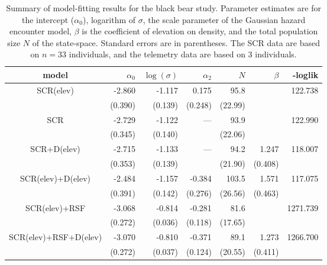 \begin{table}
\centering
\caption{
Summary of model-fitting results for the black bear study. Parameter
estimates are for the intercept ($\alpha_{0}$), logarithm of $\sigma$,
the
scale parameter of the Gaussian hazard encounter model,
 $\beta$ is the coefficient of elevation on density, and the total
 population size $N$ of the state-space. Standard errors
 are in parentheses.
The SCR data are based on $n=33$ individuals, and the telemetry data
are based on 3 individuals.
}
\begin{tabular}{c|rrrrrr}
\hline \hline
model         & $\alpha_0$ & $\log(\sigma)$ & $\alpha_{2}$ & $N$ &
$\beta$       & -loglik                                                                         \\ \hline
SCR(elev)      & -2.860    & -1.117        & 0.175       & 95.8        &        & 122.738  \\
             &  (0.390)     & (0.139)       & (0.248)       & (22.99)        &        &           \\
SCR          & -2.729    & -1.122        & ---          & 93.9        &        & 122.990  \\
              & (0.345)     & (0.140)       &              & (22.06)        &        &           \\
SCR+D(elev)      & -2.715    & -1.133        & ---          & 94.2        & 1.247 & 118.007  \\
              & (0.353)     & (0.139)       &              & (21.90)    & (0.408) &           \\
SCR(elev)+D(elev) & -2.484    & -1.157        & -0.384      & 103.5        & 1.571 & 117.075  \\
              & (0.391)     & (0.142)       & (0.276)       & (26.56)   & (0.463) &           \\
SCR(elev)+RSF       & -3.068    & -0.814        & -0.281      & 81.6        &        & 1271.739 \\
              & (0.272)    & (0.036)         & (0.118)       & (17.65)        &        &           \\
SCR(elev)+RSF+D(elev)  & -3.070    & -0.810        & -0.371      & 89.1        & 1.273 & 1266.700 \\
              & (0.272)    & (0.037)         & (0.124)       & (20.55)        & (0.411) &           \\
\hline
\end{tabular}
\label{tab.nyresults}
\end{table}



